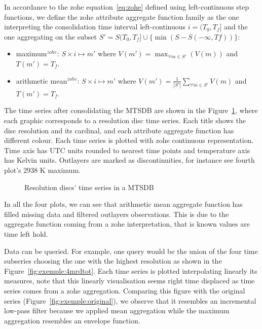 In accordance to the zohe equation~\ref{eq:zohe} defined using
left-continuous step functions, we define the zohe attribute aggregate
function family as the one interpreting the consolidation time
interval left-continuous $i=(T_0,T_f]$ and the one aggregating on the
subset $S'=S(T_0,T_f] \cup \{\min(S-S(-\infty,Tf))\}$:
\begin{itemize}
  \renewcommand{\labelitemi}{--}
\item maximum$^{zohe}$: $S \times i \mapsto m'$ where $V(m') =
  \max_{\forall m \in S'}(V(m))$ and $T(m')=T_f$.
\item arithmetic mean$^{zohe}$: $S \times i \mapsto m'$ where $V(m')
  = \frac{1}{|S'|} \sum\limits_{\forall m\in S'} V(m)$ and
  $T(m')=T_f$. 
\end{itemize}


The time series after consolidating the MTSDB are shown in the
Figure~\ref{fig:exemple:4mrd}, where each graphic corresponds to a
resolution disc time series. Each title shows the disc resolution and
its cardinal, and each attribute aggregate function has different
colour.  Each time series is plotted with zohe continuous
representation. Time axis has UTC units rounded to nearest time points
and temperature axis has Kelvin units. Outlayers are marked as
discontinuities, for instance see fourth plot's 2938 K maximum.

\begin{figure}[tp]
  \centering
  
  \caption{Resolution discs' time series in a MTSDB}
  \label{fig:exemple:4mrd}
\end{figure}

In all the four plots, we can see that arithmetic mean aggregate
function has filled missing data and filtered outlayers
observations. This is due to the aggregate function coming from a zohe
interpretation, that is known values are time left hold.

Data can be queried.  For example, one query would be the union of the
four time subseries choosing the one with the highest resolution as
shown in the Figure~\ref{fig:exemple:4mrdtot}.  Each time series is
plotted interpolating linearly its measures, note that this linearly
visualisation seems right time displaced as time series comes from a
zohe aggregation.  Comparing this figure with the original series
(Figure~\ref{fig:exemple:original}), we observe that it resembles an
incremental low-pass filter because we applied mean aggregation while
the maximum aggregation resembles an envelope function.


